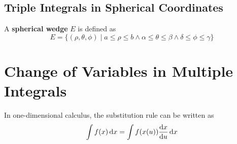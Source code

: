 \documentclass[../Calculus \Roman{3}.tex]{subfiles}
\begin{document}
		\subsection*{Triple Integrals in Spherical Coordinates}
				A \textbf{spherical wedge} $E$ is defined as
					\[E = \{(\rho, \theta, \phi) \mid a \le \rho \le b \land \alpha \le \theta \le \beta \land \delta \le \phi \le \gamma\}\]
	\section{Change of Variables in Multiple Integrals}
		In one-dimensional calculus, the substitution rule can be written as 
			\[\int f(x)\,\mathrm{d} x = \int f(x(u))\frac{\mathrm{d} x}{\mathrm{d} u}\,\mathrm{d} x\]
\end{document}
